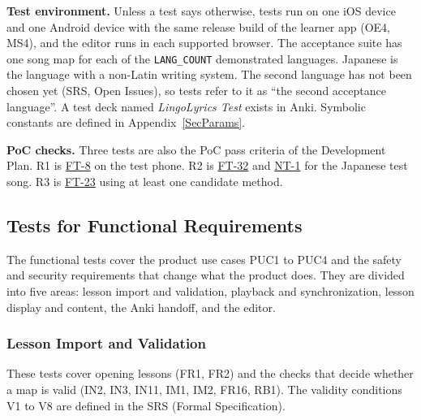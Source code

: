 \documentclass[12pt, titlepage]{article}
\newcommand{\tref}[1]{\hyperlink{test:#1}{#1}}
\newcommand{\cn}[1]{\texttt{#1}}
\begin{document}
\textbf{Test environment.} Unless a test says otherwise, tests run on one iOS
device and one Android device with the same release build of the learner app
(OE4, MS4), and the editor runs in each supported browser. The acceptance suite
has one song map for each of the \cn{LANG\_COUNT} demonstrated languages.
Japanese is the language with a non-Latin writing system. The second language
has not been chosen yet (SRS, Open Issues), so tests refer to it as ``the second
acceptance language''. A test deck named \emph{LingoLyrics Test} exists in
Anki. Symbolic constants are defined in Appendix~\ref{SecParams}.

\textbf{PoC checks.} Three tests are also the PoC pass criteria of the
Development Plan. R1 is \tref{FT-8} on the test phone. R2 is \tref{FT-32} and
\tref{NT-1} for the Japanese test song. R3 is \tref{FT-23} using at least one
candidate method.

\subsection{Tests for Functional Requirements} \label{SecFuncTests}

The functional tests cover the product use cases PUC1 to PUC4 and the safety and
security requirements that change what the product does. They are divided into
five areas: lesson import and validation, playback and synchronization, lesson
display and content, the Anki handoff, and the editor.

\subsubsection{Lesson Import and Validation} \label{SecValidationTests}

These tests cover opening lessons (FR1, FR2) and the checks that decide whether
a map is valid (IN2, IN3, IN11, IM1, IM2, FR16, RB1). The validity conditions V1
to V8 are defined in the SRS (Formal Specification).
\end{document}
